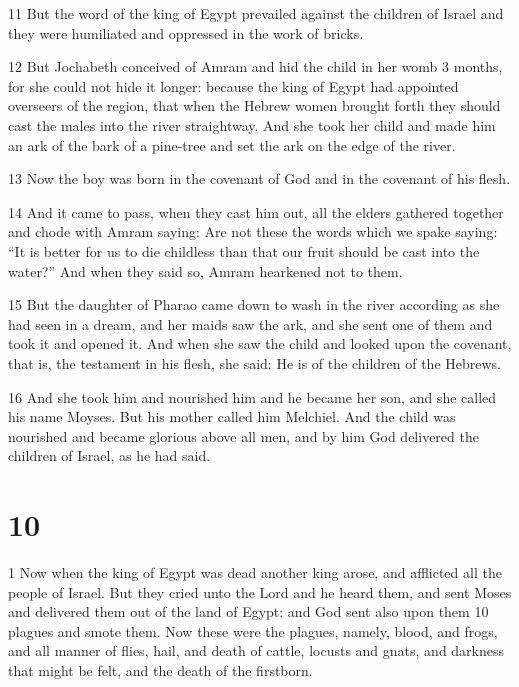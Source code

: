 \par 11 But the word of the king of Egypt prevailed against the children of Israel and they were humiliated and oppressed in the work of bricks.

\par 12 But Jochabeth conceived of Amram and hid the child in her womb 3 months, for she could not hide it longer: because the king of Egypt had appointed overseers of the region, that when the Hebrew women brought forth they should cast the males into the river straightway. And she took her child and made him an ark of the bark of a pine-tree and set the ark on the edge of the river. 

\par 13 Now the boy was born in the covenant of God and in the covenant of his flesh. 

\par 14 And it came to pass, when they cast him out, all the elders gathered together and chode with Amram saying: Are not these the words which we spake saying: “It is better for us to die childless than that our fruit should be cast into the water?” And when they said so, Amram hearkened not to them.

\par 15 But the daughter of Pharao came down to wash in the river according as she had seen in a dream, and her maids saw the ark, and she sent one of them and took it and opened it. And when she saw the child and looked upon the covenant, that is, the testament in his flesh, she said: He is of the children of the Hebrews. 

\par 16 And she took him and nourished him and he became her son, and she called his name Moyses. But his mother called him Melchiel. And the child was nourished and became glorious above all men, and by him God delivered the children of Israel, as he had said.

\chapter{10}

\par 1 Now when the king of Egypt was dead another king arose, and afflicted all the people of Israel. But they cried unto the Lord and he heard them, and sent Moses and delivered them out of the land of Egypt: and God sent also upon them 10 plagues and smote them. Now these were the plagues, namely, blood, and frogs, and all manner of flies, hail, and death of cattle, locusts and gnats, and darkness that might be felt, and the death of the firstborn.

